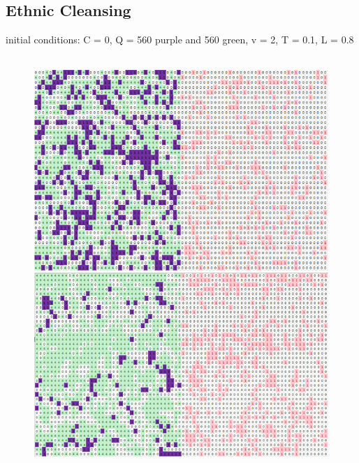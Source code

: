 \documentclass[11pt]{article}
\begin{document}
	\subsection{Ethnic Cleansing}
	initial conditions: C = 0, Q = 560 purple and 560 green, v = 2, T = 0.1, L = 0.8\\
	\\
		\begin{figure}[H]
		\includegraphics[width=\linewidth]{ethnic_cleanse1.png}
		\caption{}
		\label{fig:frenchriot}
	\end{figure}
\end{document}

